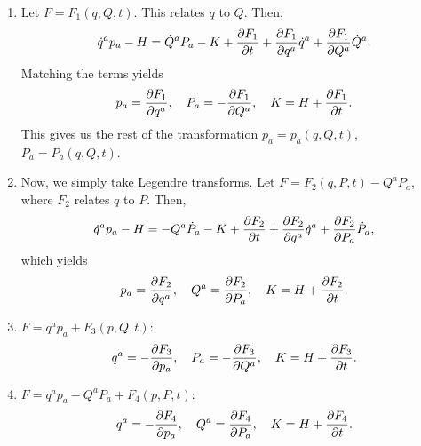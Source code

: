 \documentclass{article}
\begin{document}
\begin{enumerate}
	\item Let $ F = F_{1}(q, Q, t) $. This relates $ q $ to $ Q $. Then,
	\begin{equation}
		\dot{q}^{a} p_{a} - H = \dot{Q}^{a} P_{a} - K + \pdv{F_{1}}{t} + \pdv{F_{1}}{q^{a}} \dot{q}^{a} + \pdv{F_{1}}{Q^{a}} \dot{Q}^{a}.
	\end{equation}
	Matching the terms yields
	\begin{equation}
		p_{a} = \pdv{F_{1}}{q^{a}}, \quad P_{a} = -\pdv{F_{1}}{Q^{a}}, \quad K = H + \pdv{F_{1}}{t}.
	\end{equation}
	This gives us the rest of the transformation $ p_{a} = p_{a}(q,Q,t) $, $ P_{a} = P_{a}(q,Q,t) $.
	\item Now, we simply take Legendre transforms. Let $ F = F_{2}(q,P,t) - Q^{a} P_{a} $, where $ F_{2} $ relates $ q $ to $ P $. Then,
	\begin{equation}
		\dot{q}^{a} p_{a} - H = -Q^{a} \dot{P}_{a} - K + \pdv{F_{2}}{t} + \pdv{F_{2}}{q^{a}} \dot{q}^{a} + \pdv{F_{2}}{P_{a}} \dot{P}_{a},
	\end{equation}
	which yields
	\begin{equation}
		p_{a} = \pdv{F_{2}}{q^{a}}, \quad Q^{a} = \pdv{F_{2}}{P_{a}}, \quad K = H + \pdv{F_{2}}{t}.
	\end{equation}
	\item $ F = q^{a} p_{a} + F_{3}(p, Q, t) $:
	\begin{equation}
		q^{a} = - \pdv{F_{3}}{p_{a}}, \quad P_{a} = -\pdv{F_{3}}{Q^{a}}, \quad K = H + \pdv{F_{3}}{t}.
	\end{equation}
	\item $ F = q^{a} p_{a} - Q^{a} P_{a} + F_{4}(p, P, t) $:
	\begin{equation}
		q^{a} = - \pdv{F_{4}}{p_{a}}, \quad Q^{a} = \pdv{F_{4}}{P_{a}}, \quad K = H + \pdv{F_{4}}{t}.
	\end{equation}
\end{enumerate}
\end{document}
